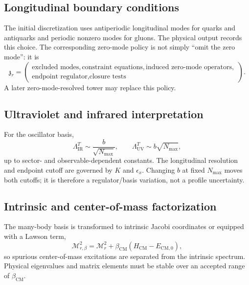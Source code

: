 \documentclass[11pt]{article}
\newcommand{\cM}{\mathcal M}
\newcommand{\UV}{\mathrm{UV}}
\newcommand{\IR}{\mathrm{IR}}
\newcommand{\COM}{\mathrm{CM}}
\begin{document}
\subsection{Longitudinal boundary conditions}

The initial discretization uses antiperiodic longitudinal modes for quarks and
antiquarks and periodic nonzero modes for gluons.  The physical output records
this choice.  The corresponding zero-mode policy is not simply ``omit the
zero mode'': it is
\begin{equation}
 \mathfrak z_r=
 \left(
 \begin{gathered}
 \text{excluded modes},\text{constraint equations},
 \text{induced zero-mode operators},\\
 \text{endpoint regulator},\text{closure tests}
 \end{gathered}
 \right).
 \label{eq:zero-mode-policy}
\end{equation}
A later zero-mode-resolved tower may replace this policy.

\subsection{Ultraviolet and infrared interpretation}

For the oscillator basis,
\begin{equation}
 \Lambda_{\IR}^{T}\sim\frac{b}{\sqrt{N_{\max}}},
 \qquad
 \Lambda_{\UV}^{T}\sim b\sqrt{N_{\max}},
 \label{eq:ho-cutoffs}
\end{equation}
up to sector- and observable-dependent constants.  The longitudinal
resolution and endpoint cutoff are governed by \(K\) and \(\epsilon_x\).
Changing \(b\) at fixed \(N_{\max}\) moves both cutoffs; it is therefore a
regulator/basis variation, not a profile uncertainty.

\subsection{Intrinsic and center-of-mass factorization}

The many-body basis is transformed to intrinsic Jacobi coordinates or equipped
with a Lawson term,
\begin{equation}
 \cM_{r,\beta}^{2}
 =\cM_r^2
 +\beta_{\COM}
 \left(
 H_{\COM}-E_{\COM,0}
 \right),
 \label{eq:lawson-term}
\end{equation}
so spurious center-of-mass excitations are separated from the intrinsic
spectrum.  Physical eigenvalues and matrix elements must be stable over an
accepted range of \(\beta_{\COM}\).
\end{document}

